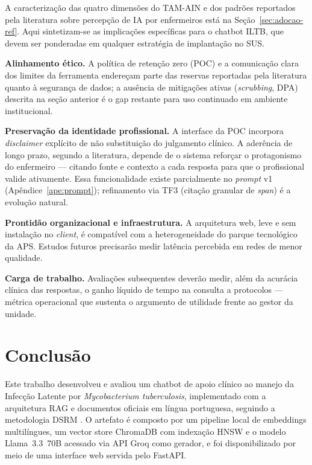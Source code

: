 \documentclass[
  12pt,
  oneside,
  a4paper,
  english,
  brazil
]{abntex2}
\begin{document}
A caracterização das quatro dimensões do TAM-AIN
\cite{nursingTAM2024} e dos padrões reportados pela literatura sobre
percepção de IA por enfermeiros está na Seção~\ref{sec:adocao-ref}.
Aqui sintetizam-se as implicações específicas para o chatbot ILTB,
que devem ser ponderadas em qualquer estratégia de implantação no SUS.

\textbf{Alinhamento ético.} A política de retenção zero (POC) e a
comunicação clara dos limites da ferramenta endereçam parte das
reservas reportadas pela literatura quanto à segurança de dados; a
ausência de mitigações ativas (\textit{scrubbing}, DPA) descrita na
seção anterior é o gap restante para uso continuado em ambiente
institucional.

\textbf{Preservação da identidade profissional.} A interface da POC
incorpora \textit{disclaimer} explícito de não substituição do
julgamento clínico. A aderência de longo prazo, segundo a literatura,
depende de o sistema reforçar o protagonismo do enfermeiro --- citando
fonte e contexto a cada resposta para que o profissional valide
ativamente. Essa funcionalidade existe parcialmente no \textit{prompt}
v1 (Apêndice~\ref{ape:prompt}); refinamento via TF3 (citação granular
de \emph{span}) é a evolução natural.

\textbf{Prontidão organizacional e infraestrutura.} A arquitetura web,
leve e sem instalação no \textit{client}, é compatível com a
heterogeneidade do parque tecnológico da APS. Estudos futuros
precisarão medir latência percebida em redes de menor qualidade.

\textbf{Carga de trabalho.} Avaliações subsequentes deverão medir,
além da acurácia clínica das respostas, o ganho líquido de tempo na
consulta a protocolos --- métrica operacional que sustenta o
argumento de utilidade frente ao gestor da unidade.

\chapter{Conclusão}
\label{cap:conclusao}

Este trabalho desenvolveu e avaliou um chatbot de apoio clínico ao manejo da
Infecção Latente por \textit{Mycobacterium tuberculosis}, implementado com a
arquitetura RAG e documentos oficiais em língua portuguesa, seguindo a
metodologia DSRM \cite{peffers2007}. O artefato é composto por um pipeline
local de embeddings multilíngues, um vector store ChromaDB com
indexação HNSW e o modelo Llama~3.3~70B acessado via API Groq como gerador, e
foi disponibilizado por meio de uma interface web servida pelo FastAPI.
\end{document}
